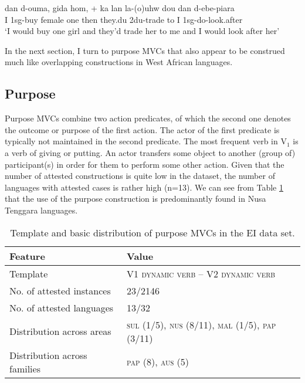 \ea \label{Sougb_36}
\gll dan d-ouma, gida hom, + ka lan la-(o)uhw dou dan d-ebe-piara \\
I 1\acs{sg}-buy female one then they.\acs{du} 2\acs{du}-trade to I 1\acs{sg}-do-look.after \\
\glft `I would buy one girl and they'd trade her to me and I would look after her' \\ 
\z
\xe

In the next section, I turn to purpose MVCs that also appear to be construed much like overlapping constructions in West African languages.

\subsection{Purpose} \label{sec:purpose}

Purpose MVCs combine two action predicates, of which the second one denotes the outcome or purpose of the first action. The actor of the first predicate is typically not maintained in the second predicate. The most frequent verb in V$_1$ is a verb of giving or putting. An actor transfers some object to another (group of) participant(s) in order for them to perform some other action. Given that the number of attested constructions is quite low in the dataset, the number of languages with attested cases is rather high (n=13). We can see from Table \ref{table:purpose} that the use of the purpose construction is predominantly found in Nusa Tenggara languages.

\begin{table}


\begin{tabular}{ll}
\lsptoprule
Feature&Value\tabularnewline
\hline
Template& V1 \textsc{dynamic verb} -- V2 \textsc{dynamic verb}\tabularnewline
No. of attested instances& 23/2146 \tabularnewline
No. of attested languages& 13/32 \tabularnewline
Distribution across areas& \textsc{sul} (1/5), \textsc{nus} (8/11), \textsc{mal} (1/5), \textsc{pap} (3/11) \tabularnewline
Distribution across families& \textsc{pap} (8), \textsc{aus} (5) \tabularnewline
\hline
\end{tabular}
\caption[Template and basic distribution of purpose MVCs]{Template and basic distribution of purpose MVCs in the EI data set.}
\label{table:purpose}
\end{table}


